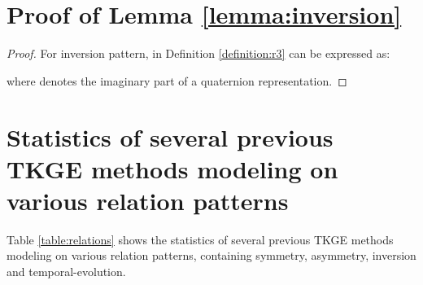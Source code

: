 \documentclass[11pt]{article}
\begin{document}
\section{Proof of Lemma \ref{lemma:inversion}}
\label{app:proof_inversion}
\begin{proof}
For inversion pattern,  in Definition \ref{definition:r3} can be expressed as:

where  denotes the imaginary part of a quaternion representation.
\end{proof}

\section{Statistics of several previous TKGE methods modeling on various relation patterns}
\label{app:Statistics}

Table \ref{table:relations} shows the statistics of several previous TKGE methods modeling on various relation patterns, containing symmetry, asymmetry, inversion and temporal-evolution. 

\begin{table}[t!]
\centering
{}
\caption{Statistics of several previous TKGE methods modeling on various relation patterns.}
\label{table:relations}
\end{table}
\end{document}

